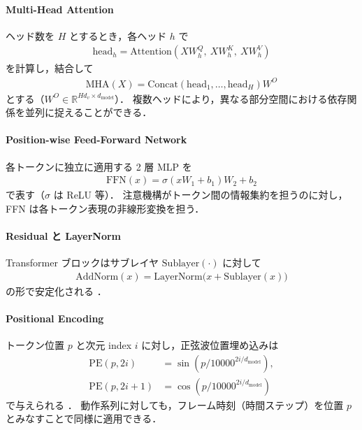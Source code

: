 \paragraph{Multi-Head Attention}
ヘッド数を $H$ とするとき，各ヘッド $h$ で
\begin{align}
  \mathrm{head}_h
  = \mathrm{Attention}\!\left(XW_h^Q,\ XW_h^K,\ XW_h^V\right)
\end{align}
を計算し，結合して
\begin{align}
  \mathrm{MHA}(X)
  = \mathrm{Concat}(\mathrm{head}_1,\dots,\mathrm{head}_H)W^O
\end{align}
とする（$W^O\in\mathbb{R}^{Hd_v\times d_{\mathrm{model}}}$）\cite{Transformer}．
複数ヘッドにより，異なる部分空間における依存関係を並列に捉えることができる．

\paragraph{Position-wise Feed-Forward Network}
各トークンに独立に適用する 2 層 MLP を
\begin{align}
  \mathrm{FFN}(x)=\sigma(xW_1+b_1)W_2+b_2
\end{align}
で表す（$\sigma$ は ReLU 等）\cite{Transformer}．
注意機構がトークン間の情報集約を担うのに対し，
FFN は各トークン表現の非線形変換を担う．

\paragraph{Residual と LayerNorm}
Transformer ブロックはサブレイヤ $\mathrm{Sublayer}(\cdot)$ に対して
\begin{align}
  \mathrm{AddNorm}(x)=\mathrm{LayerNorm}\bigl(x+\mathrm{Sublayer}(x)\bigr)
\end{align}
の形で安定化される \cite{Transformer}．

\paragraph{Positional Encoding}
トークン位置 $p$ と次元 index $i$ に対し，正弦波位置埋め込みは
\begin{align}
  \mathrm{PE}(p,2i)   & = \sin\left(p/10000^{2i/d_{\mathrm{model}}}\right), \\
  \mathrm{PE}(p,2i+1) & = \cos\left(p/10000^{2i/d_{\mathrm{model}}}\right)
\end{align}
で与えられる \cite{Transformer}．
動作系列に対しても，フレーム時刻（時間ステップ）を位置 $p$ とみなすことで同様に適用できる．

